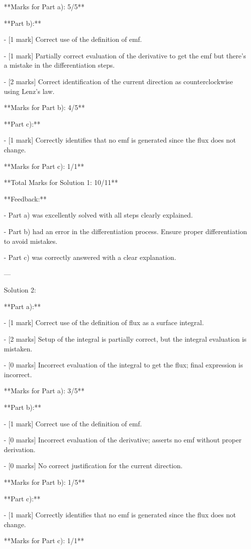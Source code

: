 \documentclass[a4paper,11pt]{article}
\begin{document}
**Marks for Part a): 5/5**

**Part b):**

- [1 mark] Correct use of the definition of emf.

- [1 mark] Partially correct evaluation of the derivative to get the emf but there's a mistake in the differentiation steps.

- [2 marks] Correct identification of the current direction as counterclockwise using Lenz's law.

**Marks for Part b): 4/5**

**Part c):**

- [1 mark] Correctly identifies that no emf is generated since the flux does not change.

**Marks for Part c): 1/1**

**Total Marks for Solution 1: 10/11**

**Feedback:**

- Part a) was excellently solved with all steps clearly explained.

- Part b) had an error in the differentiation process. Ensure proper differentiation to avoid mistakes.

- Part c) was correctly answered with a clear explanation.

---

Solution 2:

**Part a):**

- [1 mark] Correct use of the definition of flux as a surface integral.

- [2 marks] Setup of the integral is partially correct, but the integral evaluation is mistaken.

- [0 marks] Incorrect evaluation of the integral to get the flux; final expression is incorrect.

**Marks for Part a): 3/5**

**Part b):**

- [1 mark] Correct use of the definition of emf.

- [0 marks] Incorrect evaluation of the derivative; asserts no emf without proper derivation.

- [0 marks] No correct justification for the current direction.

**Marks for Part b): 1/5**

**Part c):**

- [1 mark] Correctly identifies that no emf is generated since the flux does not change.

**Marks for Part c): 1/1**
\end{document}
